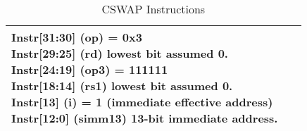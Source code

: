 \documentclass{book}
\begin{document}
\begin{table}[p]
\begin{tabular}[p]{|p{.45\textwidth}|p{.45\textwidth}|}
{    Instr[31:30] (op) = 0x3\\
    Instr[29:25] (rd)    lowest bit assumed 0.\\
    Instr[24:19] (op3) = 111111\\
    Instr[18:14] (rs1)   lowest bit assumed 0.\\
    Instr[13]    (i)  = 1 (immediate effective address)\\
    Instr[12:0]  (simm13) 13-bit immediate address.\\
} & 
 \parbox{\linewidth}{~}\\
\hline
  \end{tabular}
  \caption{CSWAP Instructions}
  \label{tab:cswap:insns}
\end{table}
  
\newpage



\newpage

\end{document}
